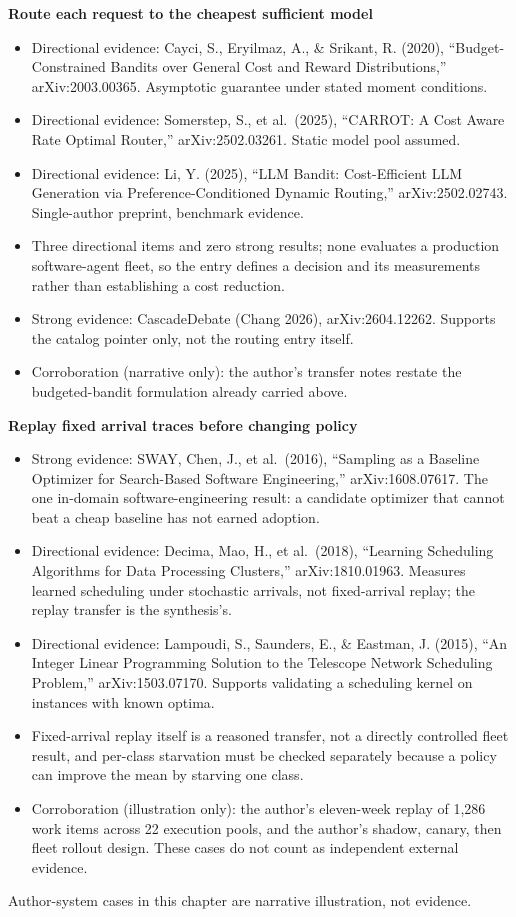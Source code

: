 \textbf{Route each request to the cheapest sufficient model}

\begin{itemize}
\tightlist
\item
  Directional evidence: Cayci, S., Eryilmaz, A., \& Srikant, R. (2020), ``Budget-Constrained Bandits over General Cost and Reward Distributions,'' arXiv:2003.00365. Asymptotic guarantee under stated moment conditions.
\item
  Directional evidence: Somerstep, S., et al.~(2025), ``CARROT: A Cost Aware Rate Optimal Router,'' arXiv:2502.03261. Static model pool assumed.
\item
  Directional evidence: Li, Y. (2025), ``LLM Bandit: Cost-Efficient LLM Generation via Preference-Conditioned Dynamic Routing,'' arXiv:2502.02743. Single-author preprint, benchmark evidence.
\item
  Three directional items and zero strong results; none evaluates a production software-agent fleet, so the entry defines a decision and its measurements rather than establishing a cost reduction.
\item
  Strong evidence: CascadeDebate (Chang 2026), arXiv:2604.12262. Supports the catalog pointer only, not the routing entry itself.
\item
  Corroboration (narrative only): the author's transfer notes restate the budgeted-bandit formulation already carried above.
\end{itemize}

\textbf{Replay fixed arrival traces before changing policy}

\begin{itemize}
\tightlist
\item
  Strong evidence: SWAY, Chen, J., et al.~(2016), ``Sampling as a Baseline Optimizer for Search-Based Software Engineering,'' arXiv:1608.07617. The one in-domain software-engineering result: a candidate optimizer that cannot beat a cheap baseline has not earned adoption.
\item
  Directional evidence: Decima, Mao, H., et al.~(2018), ``Learning Scheduling Algorithms for Data Processing Clusters,'' arXiv:1810.01963. Measures learned scheduling under stochastic arrivals, not fixed-arrival replay; the replay transfer is the synthesis's.
\item
  Directional evidence: Lampoudi, S., Saunders, E., \& Eastman, J. (2015), ``An Integer Linear Programming Solution to the Telescope Network Scheduling Problem,'' arXiv:1503.07170. Supports validating a scheduling kernel on instances with known optima.
\item
  Fixed-arrival replay itself is a reasoned transfer, not a directly controlled fleet result, and per-class starvation must be checked separately because a policy can improve the mean by starving one class.
\item
  Corroboration (illustration only): the author's eleven-week replay of 1,286 work items across 22 execution pools, and the author's shadow, canary, then fleet rollout design. These cases do not count as independent external evidence.
\end{itemize}

Author-system cases in this chapter are narrative illustration, not evidence.
